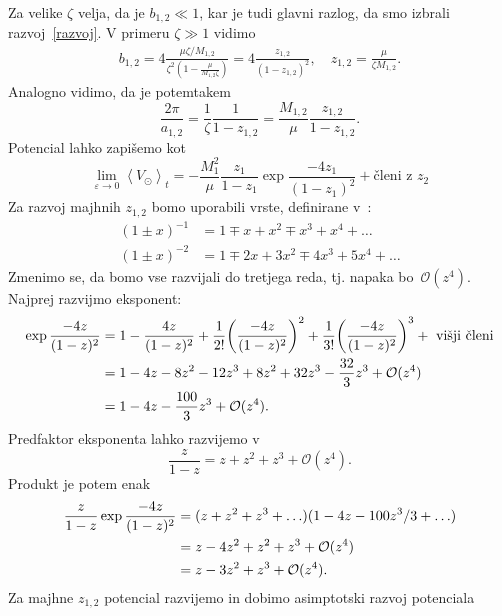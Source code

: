 \documentclass[12pt, a4paper]{article}
\newcommand{\avgt}[1]{
	\ensuremath{\left\langle #1 \right\rangle_t}
}
\begin{document}
Za velike $\zeta$ velja, da je $b_{1,2} \ll 1$, kar je tudi glavni razlog, da smo izbrali razvoj~\eqref{razvoj}.
V primeru $\zeta \gg 1$ vidimo
\begin{align}
	b_{1,2} = 4 \frac{\mu\zeta/M_{1,2}}{\zeta^2(1 - \frac{\mu}{M_{1,2}\zeta})} = 4\frac{z_{1,2}}{(1 - z_{1,2})^2},
	\quad z_{1,2} = \frac{\mu}{\zeta M_{1,2}}.
\end{align}
Analogno vidimo, da je potemtakem
\begin{equation}
	\frac{2\pi}{a_{1,2}} = \frac{1}{\zeta}\frac{1}{1 - z_{1,2}} = \frac{M_{1,2}}{\mu}\frac{z_{1,2}}{1 - z_{1,2}}.
\end{equation}
Potencial lahko zapi\v semo kot
\begin{equation}
	\lim_{\varepsilon \to 0}\avgt{V_\odot} = -\frac{M_1^2}{\mu}\frac{z_1}{1 - z_1}\exp\frac{-4z_1}{(1 - z_1)^2} +
		\text{\v cleni z $z_2$}
\end{equation}
Za razvoj majhnih $z_{1,2}$ bomo uporabili vrste, definirane v~\cite{bronstejn}:
\begin{align}
	(1 \pm x)^{-1} &= 1 \mp x + x^2 \mp x^3 + x^4 + \ldots \\
	(1 \pm x)^{-2} &= 1 \mp 2x + 3x^2 \mp 4 x^3 + 5x^4 + \ldots
\end{align}
Zmenimo se, da bomo vse razvijali do tretjega reda, tj. napaka bo~$\mathcal{O}(z^4)$. Najprej razvijmo eksponent:
\begin{align}
	\exp\frac{-4z}{(1 - z)^2} &= 1 - \frac{4z}{(1 - z)^2} + \frac{1}{2!}\bigg(\frac{-4z}{(1 - z)^2}\bigg)^2
		+ \frac{1}{3!}\bigg(\frac{-4z}{(1 - z)^2}\bigg)^3 +\ \text{vi\v sji \v cleni}
	\notag \\
	&= 1 - 4z - 8z^2 - 12z^3 + 8z^2 + 32z^3 - \frac{32}{3}z^3 + \mathcal{O}(z^4) \notag \\
	&= 1 - 4z - \frac{100}{3}z^3 + \mathcal{O}(z^4).
\end{align}
Predfaktor eksponenta lahko razvijemo v
\begin{equation}
	\frac{z}{1 - z} = z + z^2 + z^3 + \mathcal{O}(z^4).
\end{equation}
Produkt je potem enak
\begin{align}
	\frac{z}{1 - z}\exp\frac{-4z}{(1 - z)^2} &= (z + z^2 + z^3 + \ldots)(1 - 4z - 100z^3/3 + \ldots) \notag \\
	&= z - 4z^2 + z^2 + z^3 + \mathcal{O}(z^4) \notag \\
	&= z - 3z^2 + z^3 + \mathcal{O}(z^4).
\end{align}
Za majhne $z_{1,2}$ potencial razvijemo in dobimo asimptotski razvoj potenciala
\end{document}
